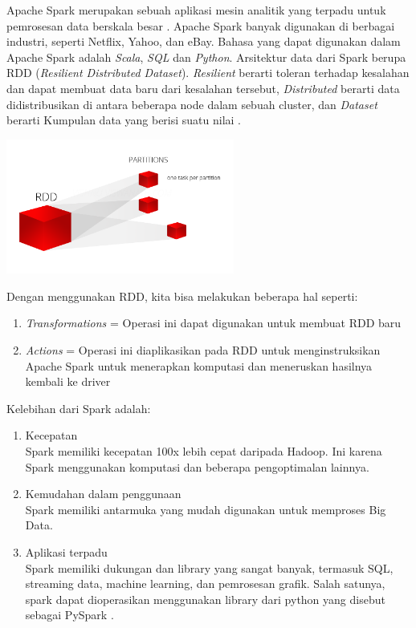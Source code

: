 \documentclass[12pt,a4paper]{report}
\begin{document}
	Apache Spark merupakan sebuah aplikasi mesin analitik yang terpadu untuk pemrosesan data berskala besar \cite{Apache2018}. Apache Spark banyak digunakan di berbagai industri, seperti Netflix, Yahoo, dan eBay. Bahasa yang dapat digunakan dalam Apache Spark adalah \textit{Scala}, \textit{SQL} dan \textit{Python}. Arsitektur data dari Spark berupa RDD (\textit{Resilient Distributed Dataset}). \textit{Resilient} berarti toleran terhadap kesalahan dan dapat membuat data baru dari kesalahan tersebut, \textit{Distributed} berarti data didistribusikan di antara beberapa node dalam sebuah cluster, dan \textit{Dataset} berarti Kumpulan data yang berisi suatu nilai \cite{Chand2020}.
	\begin{center}
		\includegraphics[width=7.5cm]{gambar/rdd.png}
		\label{rdd}
	\end{center}
	Dengan menggunakan RDD, kita bisa melakukan beberapa hal seperti:
	\begin{enumerate}
		\item \textit{Transformations} = Operasi ini dapat digunakan untuk membuat RDD baru
		\item \textit{Actions} = Operasi ini diaplikasikan pada RDD untuk menginstruksikan Apache Spark untuk menerapkan komputasi dan meneruskan hasilnya kembali ke driver
	\end{enumerate}
	Kelebihan dari Spark adalah:
	\begin{enumerate}
		\item Kecepatan\\
		Spark memiliki kecepatan 100x lebih cepat daripada Hadoop. Ini karena Spark menggunakan komputasi dan beberapa pengoptimalan lainnya. 
		\item Kemudahan dalam penggunaan\\
		Spark memiliki antarmuka yang mudah digunakan untuk memproses Big Data.
		\item Aplikasi terpadu\\
		Spark memiliki dukungan dan library yang sangat banyak, termasuk SQL, streaming data, machine learning, dan pemrosesan grafik. Salah satunya, spark dapat dioperasikan menggunakan library dari python yang disebut sebagai PySpark \cite{Databricks}.
	\end{enumerate}
	
\end{document}
